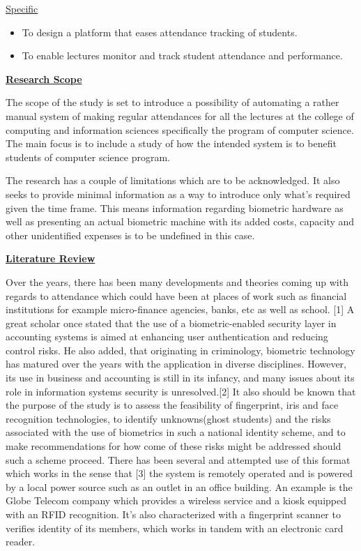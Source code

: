 \documentclass[]{report}
\begin{document}
\begin{flushleft}
\begin{enumerate}
		
	\end{enumerate}
	\underline{Specific}
	\begin{itemize}
		\item To design a platform that eases attendance tracking of students.
	\item 	To enable lectures monitor and track student attendance and performance.
		
		
	\end{itemize}
\underline{\textbf{Research Scope}} \linebreak

The scope of the study is set to introduce a possibility of automating a rather manual system of making regular attendances for all the lectures at the college of computing and  information sciences specifically the program of computer science. The main focus is to include a study of how the intended system is to benefit students of computer science program.\linebreak

The research has a couple of limitations which are to be acknowledged. It also seeks to provide minimal information as a way to introduce only what’s required given the time frame. This means information regarding biometric hardware  as well as presenting an actual biometric machine with its added costs, capacity and other unidentified expenses is to be undefined in this case.\linebreak

\textbf{\underline{Literature Review}
}\linebreak

Over the years, there has been many developments and theories coming up with regards to attendance which could have been at places of work such as financial institutions for example micro-finance agencies, banks, etc as well as school. [1] A great scholar once stated that the use of a biometric-enabled security layer in accounting systems is aimed at enhancing user authentication and reducing control risks. He also added, that originating in criminology, biometric technology has matured over the years with the application in diverse disciplines. However, its use in business  and accounting is still in its infancy, and many issues about its role in information systems security is unresolved.[2] It also should be known that the purpose of the study is to assess the feasibility  of fingerprint, iris and face recognition technologies, to identify unknowns(ghost students) and the risks associated with the use of biometrics in such a national identity scheme, and to make  recommendations for how come of these risks might be addressed should such a scheme proceed. There has been several and attempted use of this format which works in the sense that [3] the system is remotely operated and is powered by a local power source such as an outlet in an office building. An example is the Globe Telecom company which provides a wireless service and a kiosk equipped with an RFID recognition. It’s also characterized with a fingerprint scanner to verifies identity of its members, which works in tandem with an electronic card reader.\linebreak


\end{flushleft}
\end{document}
